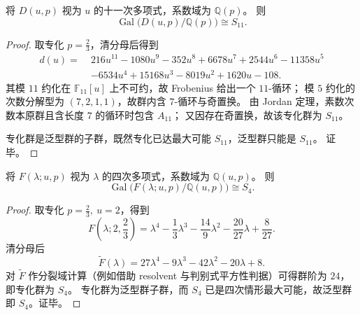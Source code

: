 \begin{theorem}\label{thm:xi-branch-polynomial-generic-galois-s11}
将 \(D(u,p)\) 视为 \(u\) 的十一次多项式，系数域为 \(\mathbb Q(p)\)。
则
\[
\operatorname{Gal}\bigl(D(u,p)/\mathbb Q(p)\bigr)\cong S_{11}.
\]
\end{theorem}
\begin{proof}
取专化 \(p=\frac23\)，清分母后得到
\[
\begin{aligned}
d(u)=\;&216u^{11}-1080u^{9}-352u^{8}+6678u^{7}+2544u^{6}-11358u^{5}\\
&-6534u^{4}+15168u^{3}-8019u^{2}+1620u-108.
\end{aligned}
\]
其模 \(11\) 约化在 \(\mathbb F_{11}[u]\) 上不可约，故 Frobenius 给出一个 \(11\)-循环；
模 \(5\) 约化的次数分解型为 \((7,2,1,1)\)，故群内含 \(7\)-循环与奇置换。
由 Jordan 定理，素数次数本原群且含长度 \(7\) 的循环时包含 \(A_{11}\)；
又因存在奇置换，故该专化群为 \(S_{11}\)。

专化群是泛型群的子群，既然专化已达最大可能 \(S_{11}\)，泛型群只能是 \(S_{11}\)。
证毕。
\end{proof}

\begin{theorem}\label{thm:xi-quartic-spectrum-generic-galois-s4}
将 \(F(\lambda;u,p)\) 视为 \(\lambda\) 的四次多项式，系数域为 \(\mathbb Q(u,p)\)。
则
\[
\operatorname{Gal}\bigl(F(\lambda;u,p)/\mathbb Q(u,p)\bigr)\cong S_4.
\]
\end{theorem}
\begin{proof}
取专化 \(p=\frac23,\ u=2\)，得到
\[
F\!\left(\lambda;2,\frac23\right)
=\lambda^4-\frac13\lambda^3-\frac{14}{9}\lambda^2-\frac{20}{27}\lambda+\frac{8}{27}.
\]
清分母后
\[
\widetilde F(\lambda)=27\lambda^4-9\lambda^3-42\lambda^2-20\lambda+8.
\]
对 \(\widetilde F\) 作分裂域计算（例如借助 resolvent 与判别式平方性判据）可得群阶为 \(24\)，即专化群为 \(S_4\)。
专化群为泛型群子群，而 \(S_4\) 已是四次情形最大可能，故泛型群即 \(S_4\)。证毕。
\end{proof}

